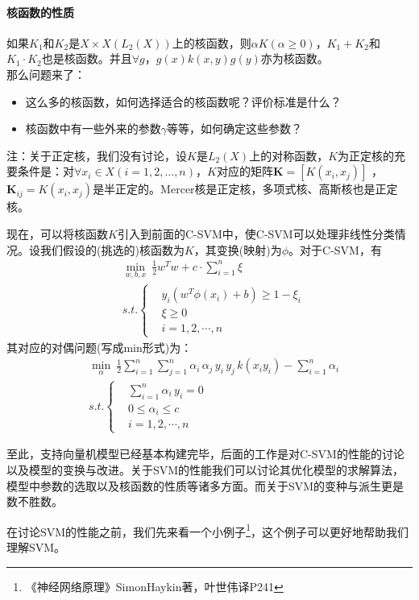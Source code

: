 	\par
	\paragraph{核函数的性质}如果$K_1$和$K_2$是$X\times X$$\left(L_2(X)\right)$上的核函数，则$\alpha K(\alpha \geqslant 0)$，$K_1+K_2$和$K_1\cdot K_2$也是核函数。并且$\forall g$，$g(x)k(x,y)g(y)$亦为核函数。\\
	那么问题来了：
	\begin{itemize}
	  \item 这么多的核函数，如何选择适合的核函数呢？评价标准是什么？
	  \item 核函数中有一些外来的参数$\gamma$等等，如何确定这些参数？
	\end{itemize}
	注：关于正定核，我们没有讨论，设$K$是$L_2(X)$上的对称函数，$K$为正定核的充要条件是：对$\forall x_i\in X(i=1,2,\dots,n)$，$K$对应的矩阵$\mathbf K=\left[K(x_i,x_j)\right]$ ，$\mathbf K_{ij}=K(x_i,x_j)$是半正定的。Mercer核是正定核，多项式核、高斯核也是正定核。
	\par
	现在，可以将核函数$K$引入到前面的C-SVM中，使C-SVM可以处理非线性分类情况。设我们假设的(挑选的)核函数为$K$，其变换(映射)为$\phi$。对于C-SVM，有
	\begin{align*}
	& \min_{w,b,x} \ \frac{1}{2} w^T w + c \cdot \sum_{i=1}^{n} \xi \\
	& s.t. \left\{
	\begin{aligned}
	& y_i (w^T \phi (x_i) + b) \geqslant 1 - \xi_i \\
	& \xi \geqslant 0 \\
	& i = 1,2,\cdots,n
	\end{aligned}
	\right.
	\end{align*}
	其对应的对偶问题(写成min形式)为：
	\begin{align*}
	& \min_\alpha \ \frac{1}{2} \sum_{i=1}^{n} \sum_{j=1}^{n} \alpha_i \, \alpha_j \, y_i \, y_j \, k(x_i y_i) - \sum_{i=1}^{n} \alpha_i \\
	& s.t. \left\{
	\begin{aligned}
	& \sum_{i=1}^{n} \alpha_i \,  y_i = 0 \\
	& 0 \leqslant \alpha_i \leqslant c \\
	& i = 1, 2, \cdots, n
	\end{aligned}
	\right.
	\end{align*}
	\par
	至此，支持向量机模型已经基本构建完毕，后面的工作是对C-SVM的性能的讨论以及模型的变换与改进。关于SVM的性能我们可以讨论其优化模型的求解算法，模型中参数的选取以及核函数的性质等诸多方面。而关于SVM的变种与派生更是数不胜数。
	\par
	在讨论SVM的性能之前，我们先来看一个小例子\footnote{《神经网络原理》SimonHaykin著，叶世伟译P241}，这个例子可以更好地帮助我们理解SVM。

